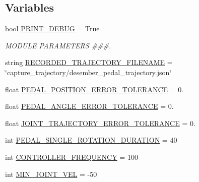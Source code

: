 \subsection*{Variables}
\begin{DoxyCompactItemize}
\item 
bool \mbox{\hyperlink{namespacepedal__simulation__interpolation__cubic__derivative_a3733bb593f2459fbde63dd7d7b41c527}{P\+R\+I\+N\+T\+\_\+\+D\+E\+B\+UG}} = True
\begin{DoxyCompactList}\small\item\em M\+O\+D\+U\+LE P\+A\+R\+A\+M\+E\+T\+E\+RS \#\#\#. \end{DoxyCompactList}\item 
string \mbox{\hyperlink{namespacepedal__simulation__interpolation__cubic__derivative_ab65f0e2364123ac236825cbeb227e37d}{R\+E\+C\+O\+R\+D\+E\+D\+\_\+\+T\+R\+A\+J\+E\+C\+T\+O\+R\+Y\+\_\+\+F\+I\+L\+E\+N\+A\+ME}} = \char`\"{}capture\+\_\+trajectory/desember\+\_\+pedal\+\_\+trajectory.\+json\char`\"{}
\item 
float \mbox{\hyperlink{namespacepedal__simulation__interpolation__cubic__derivative_ab063ba2202081ff4fa968e4912f31659}{P\+E\+D\+A\+L\+\_\+\+P\+O\+S\+I\+T\+I\+O\+N\+\_\+\+E\+R\+R\+O\+R\+\_\+\+T\+O\+L\+E\+R\+A\+N\+CE}} = 0.
\item 
float \mbox{\hyperlink{namespacepedal__simulation__interpolation__cubic__derivative_a44e03116b859bfe3a98ec6b62cde504d}{P\+E\+D\+A\+L\+\_\+\+A\+N\+G\+L\+E\+\_\+\+E\+R\+R\+O\+R\+\_\+\+T\+O\+L\+E\+R\+A\+N\+CE}} = 0.
\item 
float \mbox{\hyperlink{namespacepedal__simulation__interpolation__cubic__derivative_acbd3977fd006563df4cc4215a26f093b}{J\+O\+I\+N\+T\+\_\+\+T\+R\+A\+J\+E\+C\+T\+O\+R\+Y\+\_\+\+E\+R\+R\+O\+R\+\_\+\+T\+O\+L\+E\+R\+A\+N\+CE}} = 0.
\item 
int \mbox{\hyperlink{namespacepedal__simulation__interpolation__cubic__derivative_a7577c34d4e434144075b99b4a6a28a23}{P\+E\+D\+A\+L\+\_\+\+S\+I\+N\+G\+L\+E\+\_\+\+R\+O\+T\+A\+T\+I\+O\+N\+\_\+\+D\+U\+R\+A\+T\+I\+ON}} = 40
\item 
int \mbox{\hyperlink{namespacepedal__simulation__interpolation__cubic__derivative_af77cf3846b9b03940b42346d5e5d33a1}{C\+O\+N\+T\+R\+O\+L\+L\+E\+R\+\_\+\+F\+R\+E\+Q\+U\+E\+N\+CY}} = 100
\item 
int \mbox{\hyperlink{namespacepedal__simulation__interpolation__cubic__derivative_aafe823b244143b02fb3e39fa531eca6a}{M\+I\+N\+\_\+\+J\+O\+I\+N\+T\+\_\+\+V\+EL}} = -\/50
\item 

\end{DoxyCompactItemize}
